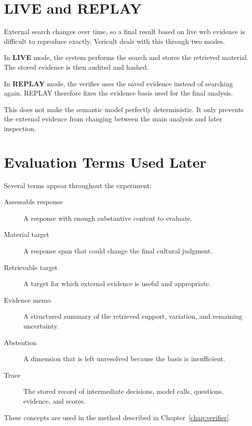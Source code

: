 \section{LIVE and REPLAY}

External search changes over time, so a final result based on live web evidence is difficult to reproduce exactly. Vericult deals with this through two modes.

In \textbf{LIVE} mode, the system performs the search and stores the retrieved material. The stored evidence is then audited and hashed.

In \textbf{REPLAY} mode, the verifier uses the saved evidence instead of searching again. REPLAY therefore fixes the evidence basis used for the final analysis.

This does not make the semantic model perfectly deterministic. It only prevents the external evidence from changing between the main analysis and later inspection.

\section{Evaluation Terms Used Later}

Several terms appear throughout the experiment:

\begin{description}
\item[Assessable response] A response with enough substantive content to evaluate.
\item[Material target] A response span that could change the final cultural judgment.
\item[Retrievable target] A target for which external evidence is useful and appropriate.
\item[Evidence memo] A structured summary of the retrieved support, variation, and remaining uncertainty.
\item[Abstention] A dimension that is left unresolved because the basis is insufficient.
\item[Trace] The stored record of intermediate decisions, model calls, questions, evidence, and scores.
\end{description}

These concepts are used in the method described in Chapter~\ref{chap:verifier}.
